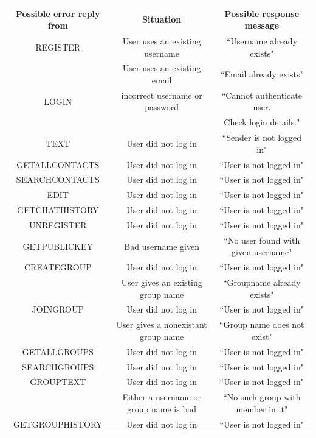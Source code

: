 \begin{table}[H]
        \centering
        \small
        \setlength\tabcolsep{5pt}
\scriptsize
\begin{tabular}{ |c |c|c| } 
 \hline
 \textbf{Possible error reply from} & \textbf{Situation} & \textbf{Possible response message } \\
 \hline
 REGISTER & User uses an existing username & ``Username already exists"  \\ 
 & User uses an existing email & ``Email already exists"
 \\  
  \hline
  LOGIN & incorrect username or password & ``Cannot authenticate user. \\
  &&Check login details."  \\
   \hline
 TEXT & User did not log in & ``Sender is not logged in"   \\ 
  \hline
 GETALLCONTACTS & User did not log in & ``User is not logged in" \\ 
  \hline
 SEARCHCONTACTS & User did not log in  & ``User is not logged in" \\ 
  \hline
 EDIT & User did not log in & ``User is not logged in" \\
  \hline
 GETCHATHISTORY  & User did not log in & ``User is not logged in"  \\
  \hline
 UNREGISTER  & User did not log in & ``User is not logged in"  \\ 
 \hline
 GETPUBLICKEY & Bad username given & ``No user found with given username"  \\ 
 \hline
 CREATEGROUP & User did not log in & ``User is not logged in" \\
 & User gives an existing group name & ``Groupname already exists"  \\ 
 \hline
 JOINGROUP& User did not log in & ``User is not logged in" \\
  & User gives a nonexistant group name & ``Group name does not exist"  \\ 
 \hline
 GETALLGROUPS& User did not log in & ``User is not logged in" \\
 \hline
 SEARCHGROUPS & User did not log in & ``User is not logged in" \\ 
 \hline
 GROUPTEXT & User did not log in & ``User is not logged in" \\
 & Either a username or group name is bad & ``No such group with member in it"  \\ 
 \hline
 GETGROUPHISTORY  & User did not log in & ``User is not logged in"  \\

\end{tabular}
\end{table}
